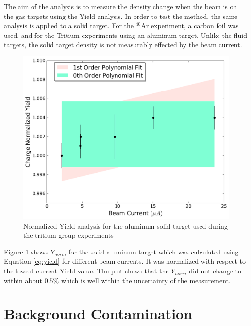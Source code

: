 \documentclass[final,5p,times,twocolumn]{elsarticle}
\begin{document}
The aim of the analysis is to measure the density change when the beam is on the gas targets using the Yield analysis. In order to test the method, the same analysis is applied to a solid target. For the $^{40}$Ar experiment, a carbon foil was used, and for the Tritium experiments using an aluminum target. Unlike the fluid targets, the solid target density is not measurably effected by the beam current.

\begin{figure}[htbp]
    \centering
    \includegraphics[width=\linewidth]{images/solid_target.pdf}
    \caption{Normalized Yield analysis for the aluminum solid target used during the tritium group experiments}
    \label{fig:solid}
\end{figure}

Figure \ref{fig:solid} shows $Y_{norm}$ for the solid aluminum target which was calculated using Equation \ref{eq:yield} for different beam currents. It was normalized with respect to the lowest current Yield value. The plot shows that the $Y_{norm}$ did not change to within about $0.5 \%$ which is well within the uncertainty of the measurement. 


\section{Background Contamination}
\end{document}
